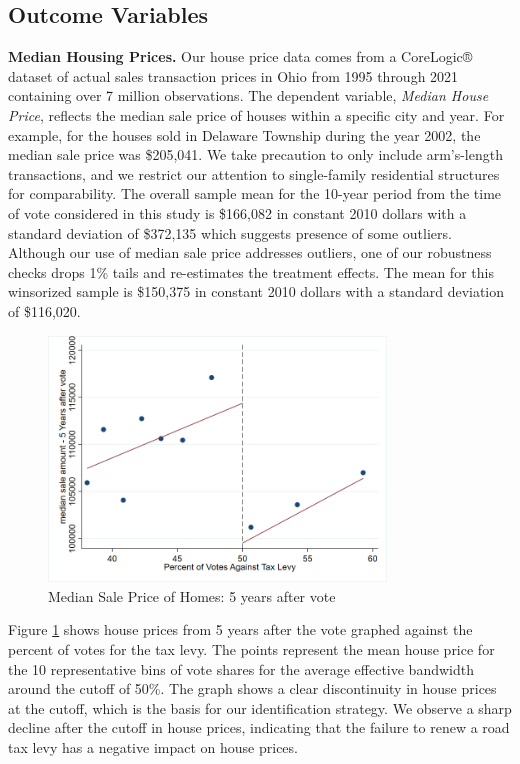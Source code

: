 \subsection{Outcome Variables}


{\bf Median Housing Prices.} Our house price data comes from a CoreLogic® dataset of actual sales transaction prices in Ohio from 1995 through 2021 containing over 7 million observations. The dependent variable, \textit{Median House Price}, reflects the median sale price of houses within a specific city and year. For example, for the houses sold in Delaware Township during the year 2002, the median sale price was \$205,041. We take precaution to only include arm’s-length transactions, and we restrict our attention to single-family residential structures for comparability.  The overall sample mean for the 10-year period from the time of vote considered in this study is \$166,082 in constant 2010 dollars with a standard deviation of \$372,135 which suggests presence of some outliers. Although our use of median sale price addresses outliers, one of our robustness checks drops 1\% tails and re-estimates the treatment effects.  The mean for this winsorized sample is \$150,375 in constant 2010 dollars with a standard deviation of \$116,020. 

\begin{figure}[ht]
    \centering
    \includegraphics[width=0.8\textwidth,keepaspectratio]{images/rd_plot_year_5_after_vote.png}
    \caption{Median Sale Price of Homes: 5 years after vote}
    \label{fig:hp_year5_after}
\end{figure}

Figure \ref{fig:hp_year5_after} shows house prices from 5 years after the vote graphed against the percent of votes for the tax levy. The points represent the mean house price for the 10 representative bins of vote shares for the average effective bandwidth around the cutoff of 50\%. The graph shows a clear discontinuity in house prices at the cutoff, which is the basis for our identification strategy. We observe a sharp decline after the cutoff in house prices, indicating that the failure to renew a road tax levy has a negative impact on house prices.


